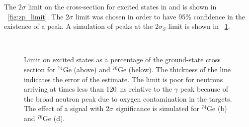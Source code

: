 The $2\sigma$ limit on the cross-section for excited \zp states in  and  is shown in {\fig}~\ref{fig:zp_limit}.  The $2\sigma$ limit was chosen in order to have 95\% confidence in the existence of a peak.  A simulation of peaks at the 2$\sigma_S$ limit is shown in {\fig}~\ref{fig:differentLimits}.
\begin{figure}[!htbp]
\centering
{}
\hspace{8pt}
 \\
\hspace{8pt}
\caption{Limit on excited \zp states as a percentage of the ground-state cross section for $^{74}$Ge (above) and $^{76}$Ge (below).  The thickness of the line indicates the error of the estimate.  The limit is poor for neutrons arriving at times less than 120~ns relative to the $\gamma$ peak because of the broad neutron peak due to oxygen contamination in the targets.  The effect of a signal with 2$\sigma$ significance is simulated for $^{74}$Ge (b) and $^{76}$Ge (d).}
\label{fig:differentLimits}
\end{figure}

